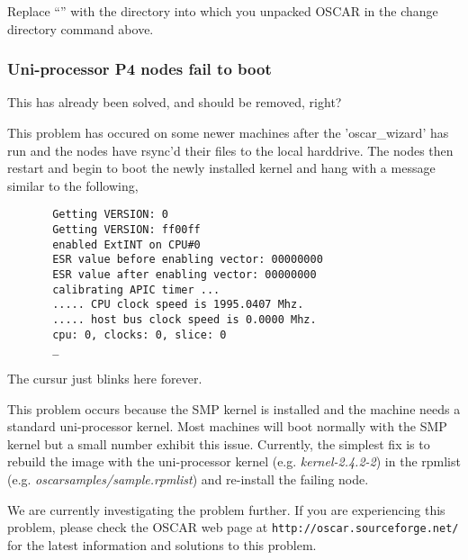 Replace ``'' with the directory into which you unpacked
OSCAR in the change directory command above.

\subsubsection{Uni-processor P4 nodes fail to boot}

\begin{discuss}
  This has already been solved, and should be removed, right?
\end{discuss}

This problem has occured on some newer machines after the 'oscar\_wizard' 
has run and the nodes have rsync'd their files to the local harddrive. 
The nodes then restart and begin to boot the newly installed kernel
and hang with a message similar to the following,
\begin{verbatim}
       Getting VERSION: 0
       Getting VERSION: ff00ff
       enabled ExtINT on CPU#0
       ESR value before enabling vector: 00000000
       ESR value after enabling vector: 00000000
       calibrating APIC timer ...
       ..... CPU clock speed is 1995.0407 Mhz.
       ..... host bus clock speed is 0.0000 Mhz.
       cpu: 0, clocks: 0, slice: 0
       _
\end{verbatim}
The cursur just blinks here forever.

This problem occurs because the SMP kernel is installed and the
machine needs a standard uni-processor kernel.  Most machines will boot
normally with the SMP kernel but a small number exhibit this issue.
Currently, the simplest fix is to rebuild the image with the
uni-processor kernel (e.g. \emph{kernel-2.4.2-2}) in the rpmlist 
(e.g. \emph{oscarsamples/sample.rpmlist}) and re-install the failing node.  

We are currently investigating the problem further.  If you are experiencing 
this problem, please check the OSCAR web page at
{\tt http://oscar.sourceforge.net/} for the latest information and solutions
to this problem.

